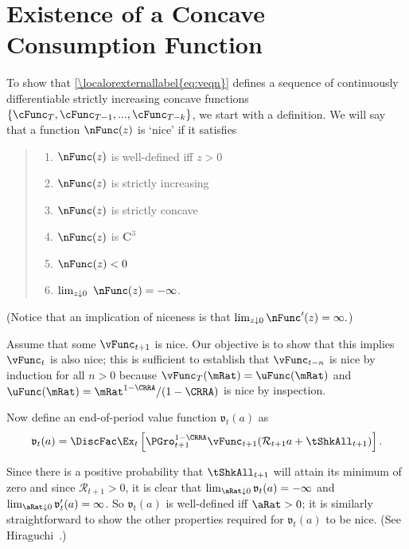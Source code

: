 \documentclass[\econtexRoot/BufferStockTheory.tex]{subfiles}
\begin{document}
\section{Existence of a Concave Consumption Function}\label{sec:ApndxcExists}

To show that \eqref{\localorexternallabel{eq:veqn}} defines a sequence of continuously
differentiable strictly increasing concave functions
$\{\cFunc_{T},\cFunc_{T-1},...,\cFunc_{T-k}\}$, we start with a
definition.  We will say that a function $\nFunc(z)$ is `nice' if it
satisfies
\begin{quote}
\begin{enumerate}\setlength{\itemsep}{0.0ex}
\item $\nFunc(z)$ is well-defined iff $z>0$

\item $\nFunc(z)$ is strictly increasing

\item $\nFunc(z)$ is strictly concave

\item $\nFunc(z)$ is $ \mathbf{C}^{3}$

\item $\nFunc(z)<0$

\item $\lim_{z\downarrow 0}~\nFunc(z) =-\infty $.

\end{enumerate}
\end{quote}


(Notice that an implication of niceness is that $\lim_{z \downarrow 0} \nFunc^{\prime}(z) = \infty.$)

Assume that some $\vFunc_{t+1}$ is nice.  Our objective is to show that this
implies $\vFunc_{t}$ is also nice; this is sufficient to establish that
$\vFunc_{t-n}$ is nice by induction for all $n > 0$ because $\vFunc_{T}(\mRat)
=\uFunc(\mRat) $ and $\uFunc(\mRat)=\mRat^{1-\CRRA}/(1-\CRRA)$ is nice by inspection.

Now define an end-of-period value function $\mathfrak{v}_{t}(a) $ as
\begin{equation}
\mathfrak{v}_{t}(a) =\DiscFac \Ex_{t}\left[{\PGro}_{t+1}^{1-\CRRA}\vFunc_{t+1}( {\mathcal{R}}_{t+1} a+{\tShkAll}_{t+1}) \right]. \label{eq:vEnd}
\end{equation}

Since there is a positive probability that $\tShkAll_{t+1}$ will
attain its minimum of zero and since $\mathcal{R}_{t+1}>0$, it
is clear that $\lim_{\aRat \downarrow 0} \mathfrak{v}_{t}(a) = -\infty$
and $\lim_{\aRat \downarrow 0} \mathfrak{v}^{\prime}_{t}(a) = \infty$.  So
$\mathfrak{v}_{t}(a) $ is well-defined iff $\aRat>0$; it is similarly
straightforward to show the other properties required for $\mathfrak{v}_{t}(a) $ to
be nice.  (See Hiraguchi~\citeyearpar{hiraguchiBSProofs}.)
\end{document}
